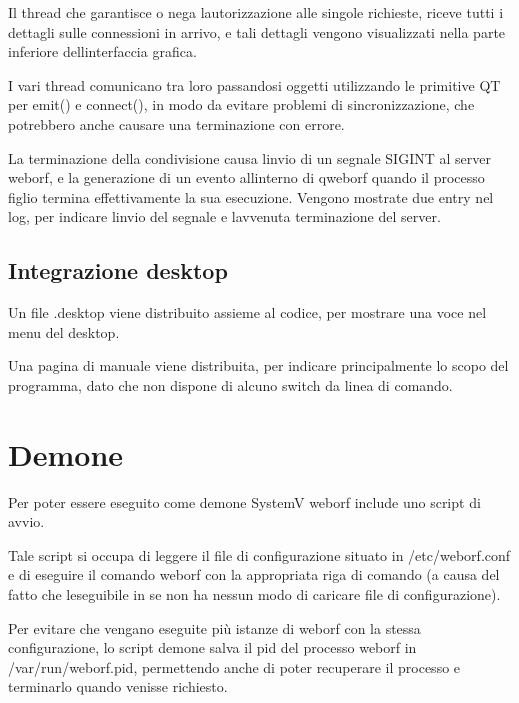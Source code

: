 \documentclass[a4paper,11pt]{article}
\begin{document}
\bigskip

{\sffamily
Il thread che garantisce o nega l{\textquotesingle}autorizzazione alle
singole richieste, riceve tutti i dettagli sulle connessioni in arrivo,
e tali dettagli vengono visualizzati nella parte inferiore
dell{\textquotesingle}interfaccia grafica.}


\bigskip

{\sffamily
I vari thread comunicano tra loro passandosi oggetti utilizzando le
primitive QT per emit() e connect(), in modo da evitare problemi di
sincronizzazione, che potrebbero anche causare una terminazione con
errore\cite{QT01}.}


\bigskip

{\sffamily
La terminazione della condivisione causa l{\textquotesingle}invio di un
segnale SIGINT al server weborf, e la generazione di un evento
all{\textquotesingle}interno di qweborf quando il processo figlio
termina effettivamente la sua esecuzione. Vengono mostrate due entry
nel log, per indicare l{\textquotesingle}invio del segnale e
l{\textquotesingle}avvenuta terminazione del server.}


\bigskip

\subsection{Integrazione desktop}
{\sffamily
Un file .desktop viene distribuito assieme al codice, per mostrare una
voce nel menu del desktop.}

{\sffamily
Una pagina di manuale viene distribuita, per indicare principalmente lo
scopo del programma, dato che non dispone di alcuno switch da linea di
comando.}


\bigskip

\section{Demone}
{\sffamily
Per poter essere eseguito come demone SystemV weborf include uno script
di avvio.}


\bigskip

{\sffamily
Tale script si occupa di leggere il file di configurazione situato in
/etc/weborf.conf e di eseguire il comando weborf con la appropriata
riga di comando (a causa del fatto che l{\textquotesingle}eseguibile in
se non ha nessun modo di caricare file di configurazione).}


\bigskip

{\sffamily
Per evitare che vengano eseguite pi\`u istanze di weborf con la stessa
configurazione, lo script demone salva il pid del processo weborf in
/var/run/weborf.pid, permettendo anche di poter recuperare il processo
e terminarlo quando venisse richiesto.}
\end{document}
